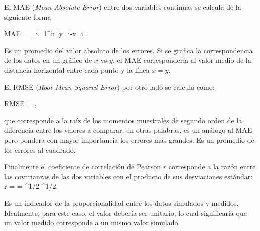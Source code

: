 El MAE (\emph{Mean Absolute Error}) entre dos variables continuas se calcula de la siguiente forma:

\be 
MAE = \sum_{i=1}^n |y_i-x_i|.
\ee

Es un promedio del valor absoluto de los errores. Si se grafica la correspondencia de los datos en un gráfico de $x$ vs $y$, el MAE correspondería al valor medio de la distancia horizontal entre cada punto y la línea $x=y$.

El RMSE (\emph{Root Mean Squared Error}) por otro lado se calcula como:

\be 
RMSE = ,
\ee

que corresponde a la raíz de los momentos muestrales de segundo orden de la diferencia entre los valores a comparar, en otras palabras, es un análogo al MAE pero pondera con mayor importancia los errores más grandes. Es un promedio de los errores al cuadrado.

Finalmente el coeficiente de correlación de Pearson $r$ corresponde a la razón entre las covarianzas de las dos variables con el producto de sus desviaciones estándar:
\be 
r =  =  {\left[\sum\limits_{i=1}^n (x_i-\overline{x})^2\right]^{1/2} \left[\sum\limits_{i=1}^n (y_i-\overline{y})^2\right]^{1/2}}.
\ee

Es un indicador de la proporcionalidad entre los datos simulados y medidos. Idealmente, para este caso, el valor debería ser unitario, lo cual significaría que un valor medido corresponde a un mismo valor simulado.